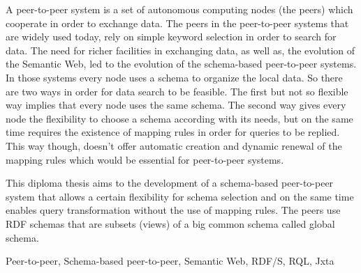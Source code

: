 \begin{abstracteng}
A peer-to-peer system is a set of autonomous computing nodes (the peers) which cooperate in order to exchange data. The peers in the peer-to-peer systems that are widely used today, rely on simple keyword selection in order to search for data. The need for richer facilities in exchanging data, as well as, the evolution of the Semantic Web, led to the evolution of the schema-based peer-to-peer systems. In those systems every node uses a schema to organize the local data. So there are two ways in order for data search to be feasible. The first but not so flexible way implies that every node uses the same schema. The second way gives every node the flexibility to choose a schema according with its needs, but on the same time requires the existence of mapping rules in order for queries to be replied. This way though, doesn't offer automatic creation and dynamic renewal of the mapping rules which would be essential for peer-to-peer systems.

This diploma thesis aims to the development of a schema-based peer-to-peer system that allows a certain flexibility for schema selection and on the same time enables query transformation without the use of mapping rules. The peers use RDF schemas that are subsets (views) of a big common schema called global schema.

   \begin{keywordseng}
      Peer-to-peer, Schema-based peer-to-peer, Semantic Web, RDF/S, RQL, Jxta
   \end{keywordseng}

\end{abstracteng}